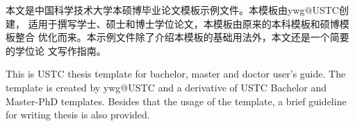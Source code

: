 ﻿\begin{cnabstract}
本文是中国科学技术大学本硕博毕业论文模板示例文件。本模板由ywg@USTC创建，
适用于撰写学士、硕士和博士学位论文，本模板由原来的本科模板和硕博模板整合
优化而来。本示例文件除了介绍本模板的基础用法外，本文还是一个简要的学位论
文写作指南。

\end{cnabstract}

\begin{enabstract}
This is USTC thesis template for bachelor, master and doctor user's guide.
The template is created by ywg@USTC and a derivative of USTC Bachelor and
Master-PhD templates. Besides that the usage of the template, a brief guideline
for writing thesis is also provided.

\end{enabstract}
